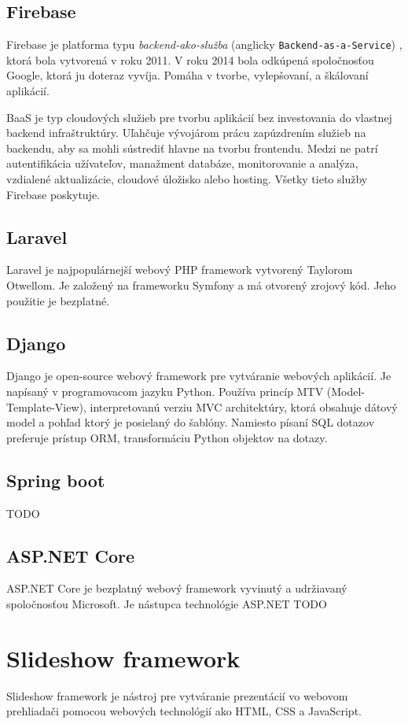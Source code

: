 \subsection{Firebase}
Firebase je platforma typu \textit{backend-ako-služba} (anglicky \texttt{Backend-as-a-Service}) , ktorá bola vytvorená v roku 2011. V roku 2014 bola odkúpená spoločnosťou Google, ktorá ju doteraz vyvíja. Pomáha v tvorbe, vylepšovaní, a škálovaní aplikácií.

BaaS je typ cloudových služieb pre tvorbu aplikácií bez investovania do vlastnej backend infraštruktúry. Uľahčuje vývojárom prácu zapúzdrením služieb na backendu, aby sa mohli sústrediť hlavne na tvorbu frontendu. Medzi ne patrí autentifikácia užívateľov, manažment databáze, monitorovanie a analýza, vzdialené aktualizácie, cloudové úložisko alebo hosting. Všetky tieto služby Firebase poskytuje. 

\subsection{Laravel}
Laravel je najpopulárnejší webový PHP framework vytvorený Taylorom Otwellom. Je založený na frameworku Symfony a má otvorený zrojový kód. Jeho použitie je bezplatné.

\subsection{Django}
Django je open-source webový framework pre vytváranie webových aplikácií. Je napísaný v programovacom jazyku Python. Používa princíp MTV (Model-Template-View), interpretovanú verziu MVC architektúry, ktorá obsahuje dátový model a pohľad ktorý je posielaný do šablóny. Namiesto písaní SQL dotazov preferuje prístup ORM, transformáciu Python objektov na dotazy.

\subsection{Spring boot}
TODO 

\subsection{ASP.NET Core}
ASP.NET Core je bezplatný webový framework vyvinutý a udržiavaný spoločnosťou Microsoft. Je nástupca technológie ASP.NET
TODO

\section{Slideshow framework}
Slideshow framework je nástroj pre vytváranie prezentácií vo webovom prehliadači pomocou webových technológií ako HTML, CSS a JavaScript.

